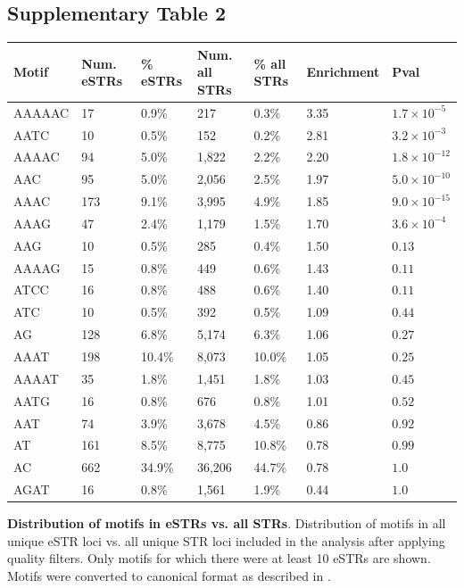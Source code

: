 \pagebreak 
\subsection{Supplementary Table 2}
\label{tab:estrsuptab2}
\begin{table}[h!]
\begin{tabular}{l|l|l|l|l|l|l}
Motif & Num. eSTRs & \% eSTRs & Num. all STRs & \% all STRs & Enrichment & Pval \\
\hline
AAAAAC & 17 & 0.9\% & 217 & 0.3\% & 3.35 & $1.7 \times 10^{-5}$\\
AATC & 10 & 0.5\% & 152 & 0.2\% & 2.81 & $3.2 \times 10^{-3}$\\
AAAAC & 94 & 5.0\% & 1,822 & 2.2\% & 2.20 & $1.8 \times 10^{-12}$ \\
AAC & 95 & 5.0\% & 2,056 & 2.5\% & 1.97 & $5.0 \times 10^{-10}$\\
AAAC & 173 & 9.1\% & 3,995 & 4.9\% & 1.85 & $9.0 \times 10^{-15}$\\
AAAG & 47 & 2.4\% & 1,179 & 1.5\% & 1.70 & $3.6 \times 10^{-4}$\\
AAG & 10 & 0.5\% & 285 & 0.4\% & 1.50 & $0.13$\\
AAAAG & 15 & 0.8\% & 449 & 0.6\% & 1.43 & $0.11$\\
ATCC & 16 & 0.8\% & 488 & 0.6\% & 1.40 & $0.11$\\
ATC & 10 & 0.5\% & 392 & 0.5\% & 1.09 & $0.44$\\
AG & 128 & 6.8\% & 5,174 & 6.3\% & 1.06 & $0.27$ \\
AAAT & 198 & 10.4\% & 8,073 & 10.0\% & 1.05 & $0.25$ \\
AAAAT & 35 & 1.8\% & 1,451 & 1.8\% & 1.03 & $0.45$ \\
AATG & 16 & 0.8\% & 676 & 0.8\% & 1.01 & $0.52$\\
AAT & 74 & 3.9\% & 3,678 & 4.5\% & 0.86 & $0.92$\\
AT & 161 & 8.5\% & 8,775 & 10.8\% & 0.78 & $0.99$\\
AC & 662 & 34.9\% & 36,206& 44.7\% & 0.78 & $1.0$\\
AGAT & 16 & 0.8\% & 1,561 & 1.9\% & 0.44 & $1.0$\\
\hline
\end{tabular}
\end{table}
\textbf{Distribution of motifs in eSTRs vs. all STRs}. Distribution of motifs in all unique eSTR loci vs. all unique STR loci included in the analysis after applying quality filters. Only motifs for which there were at least 10 eSTRs are shown. Motifs were converted to canonical format as described in \cite{WillemsGymrekHighnamEtAl2014}.

